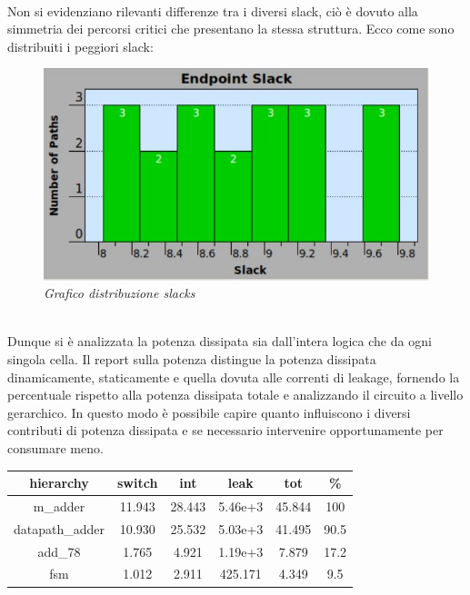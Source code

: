 \\
Non si evidenziano rilevanti differenze tra i diversi slack, ciò è dovuto alla simmetria dei percorsi critici che presentano la stessa struttura. 
Ecco come sono distribuiti i peggiori slack:
\begin{figure}[!htb]
	\centering
	\includegraphics[scale=0.6]{immagini/slacks}
	\caption{\textit{Grafico distribuzione slacks}}
	\label{datapath}
\end{figure} \\
Dunque si è analizzata la potenza dissipata sia dall’intera logica che da ogni singola cella.
Il report sulla potenza distingue la potenza dissipata dinamicamente, staticamente e quella dovuta alle correnti di leakage, fornendo la percentuale rispetto alla potenza dissipata totale e analizzando il circuito a livello gerarchico. In questo modo è possibile capire quanto influiscono i diversi contributi di potenza dissipata e se necessario intervenire opportunamente per consumare meno. 
\begin{table}[!h]\footnotesize
	\centering
	\begin{tabular}{|c|c|c|c|c|c|}
		\hline
		\textbf{hierarchy} & \textbf{switch} & \textbf{int} & \textbf{leak}& \textbf{tot}& \textbf{\%}\\
		\hline
		m\_adder & 11.943 & 28.443 & 5.46e+3 & 45.844 & 100\\
		\hline
		datapath\_adder & 10.930 & 25.532 & 5.03e+3 & 41.495 & 90.5\\
		\hline
		add\_78 & 1.765 & 4.921  & 1.19e+3 & 7.879 & 17.2\\
		\hline
		fsm & 1.012 & 2.911 & 425.171 & 4.349 & 9.5\\
		\hline
	\end{tabular}
\end{table} \\
\\
